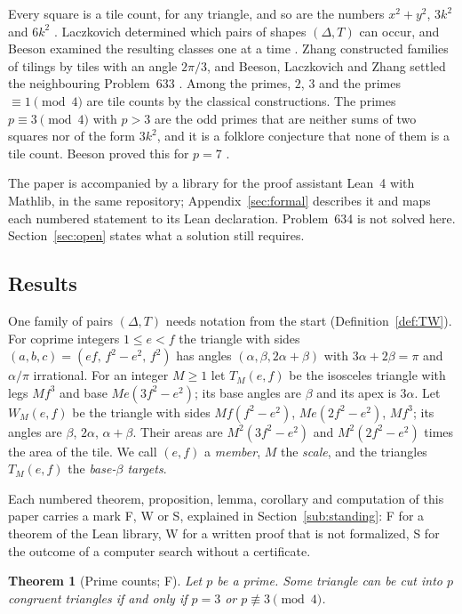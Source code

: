 \documentclass[11pt,reqno]{amsart}
\theoremstyle{plain}
\newtheorem{theorem}{Theorem}[section]
\theoremstyle{definition}
\newcommand{\sF}{\textup{\textsf{F}}}
\newcommand{\sW}{\textup{\textsf{W}}}
\newcommand{\sS}{\textup{\textsf{S}}}
\begin{document}
Every square is a tile count, for any triangle, and so are the numbers $x^2+y^2$, $3k^2$ and $6k^2$
\cite{Soifer}. Laczkovich \cite{Laczkovich1995,Laczkovich2012} determined which pairs of shapes
$(\Delta,T)$ can occur, and Beeson examined the resulting classes one at a time
\cite{BeesonI,BeesonIII,BeesonIso,BeesonSeven,BeesonEq}. Zhang \cite{Zhang} constructed families of tilings
by tiles with an angle $2\pi/3$, and Beeson, Laczkovich and Zhang settled the neighbouring Problem~633
\cite{Erdos633}. Among the primes, $2$, $3$ and the primes $\equiv1\pmod4$ are tile counts by the classical
constructions. The primes $p\equiv3\pmod4$ with $p>3$ are the odd primes that are neither sums of two
squares nor of the form $3k^2$, and it is a folklore conjecture that none of them is a tile count. Beeson
proved this for $p=7$ \cite{BeesonSeven}.

The paper is accompanied by a library for the proof assistant Lean~4 with Mathlib, in the same repository;
Appendix~\ref{sec:formal} describes it and maps each numbered statement to its Lean declaration.
Problem~634 is not solved here. Section~\ref{sec:open} states what a solution still requires.

\subsection{Results}
One family of pairs $(\Delta,T)$ needs notation from the start (Definition~\ref{def:TW}). For coprime integers
$1\le e<f$ the triangle with sides $(a,b,c)=(ef,\,f^2-e^2,\,f^2)$ has angles $(\alpha,\beta,2\alpha+\beta)$
with $3\alpha+2\beta=\pi$ and $\alpha/\pi$ irrational. For an integer $M\ge1$ let $T_M(e,f)$ be the
isosceles triangle with legs $Mf^3$ and base $Me(3f^2-e^2)$; its base angles are $\beta$ and its apex is
$3\alpha$. Let $W_M(e,f)$ be the triangle with sides $Mf(f^2-e^2)$, $Me(2f^2-e^2)$, $Mf^3$; its angles are
$\beta$, $2\alpha$, $\alpha+\beta$. Their areas are $M^2(3f^2-e^2)$ and $M^2(2f^2-e^2)$ times the area of
the tile. We call $(e,f)$ a \emph{member}, $M$ the \emph{scale}, and the triangles $T_M(e,f)$ the
\emph{base-$\beta$ targets}.

Each numbered theorem, proposition, lemma, corollary and computation of this paper carries a mark \sF,
\sW{} or \sS, explained in Section~\ref{sub:standing}: \sF{} for a theorem of the Lean library, \sW{} for a
written proof that is not formalized, \sS{} for the outcome of a computer search without a certificate.

\begin{theorem}[Prime counts; \sF]\label{thm:primes}
Let $p$ be a prime. Some triangle can be cut into $p$ congruent triangles if and only if $p=3$ or
$p\not\equiv3\pmod4$.
\end{theorem}
\end{document}
